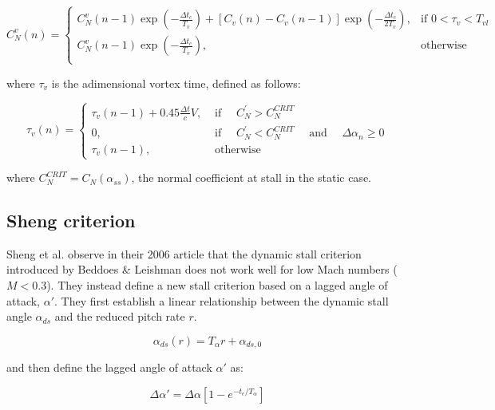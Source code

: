 \begin{equation}
	C_{N}^{v}(n)=
	\begin{cases}
		C_{N}^{v}(n-1) \exp \left(-\frac{\Delta t_c}{T_{v}}\right)+\left[C_{v}(n)-C_{v}(n-1)\right] \exp \left(-\frac{\Delta t_c}{2 T_{v}}\right), & \text{if } 0<\tau_v<T_{vl} \\
		C_{N}^{v}(n-1) \exp \left(-\frac{\Delta t_c}{T_{v}}\right), & \text{otherwise} \\
	\end{cases}	
	\label{eq:}
\end{equation}

\noindent where $\tau_v$ is the adimensional vortex time, defined as follows: 

\begin{equation}
	\tau_{v}(n)=\left\{\begin{array}{ll}
		\tau_{v}(n-1)+0.45 \frac{\Delta t}{c} V, & \text { if } \quad C_N^{\prime}>C_{N}^{CRIT} \\
		0, & \text { if } \quad C_N^{\prime}<C_{N}^{CRIT} \quad \text { and } \quad \Delta \alpha_{n} \geq 0 \\
		\tau_{v}(n-1), & \text { otherwise }
		\end{array}\right.
\end{equation}

\noindent where $C_N^{CRIT}=C_N(\alpha_{ss})$, the normal coefficient at stall in the static case. 

\subsection{Sheng criterion}
\label{section:sheng_criterion}

Sheng et al. observe in their 2006 article \cite{sheng_new_2006} that the dynamic stall criterion introduced by Beddoes \& Leishman does not work well for low Mach numbers ($M<0.3$). They instead define a new stall criterion based 
on a lagged angle of attack, $\alpha'$. They first establish a linear relationship between the dynamic stall angle $\alpha_{ds}$ and the reduced pitch rate $r$. 

\begin{equation}
	\alpha_{ds}(r) = T_\alpha r+\alpha_{ds,0}
	\label{eq:linfit}
\end{equation}

\noindent and then define the lagged angle of attack $\alpha'$ as:

\begin{equation}
\Delta \alpha' = \Delta \alpha\left[1-e^{-t_c/T_\alpha} \right]
\label{eq:alpha_lag}
\end{equation}

